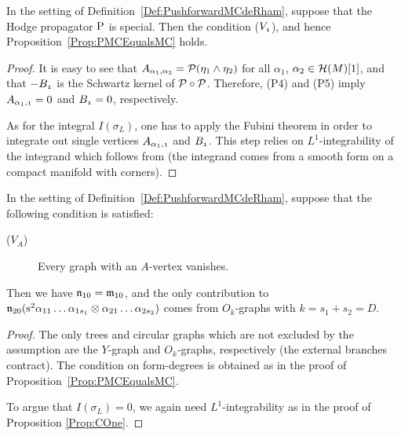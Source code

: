 \documentclass[\MainFolder/Text.tex]{subfiles}
\begin{document}
\begin{Proposition}\label{Prop:COne}
In the setting of Definition~\ref{Def:PushforwardMCdeRham}, suppose that the Hodge propagator $\mathrm{P}$ is special. Then the condition ($V_{\NOne}$), and hence Proposition~\ref{Prop:PMCEqualsMC} holds.
\end{Proposition}
\begin{proof}
It is easy to see that $A_{\alpha_1,\alpha_2} = \mathcal{P}(\eta_1 \wedge \eta_2)$ for all $\alpha_1$, $ \alpha_2\in \mathcal{H}(M)[1]$, and that $-B_{\NOne}$ is the Schwartz kernel of $\mathcal{P} \circ \mathcal{P}$. Therefore, (P4) and (P5) imply $A_{\alpha_1,\NOne}=0$ and $B_{\NOne} = 0$, respectively.

As for the integral $I(\sigma_L)$,  one has to apply the Fubini theorem in order to integrate out single vertices $A_{\alpha_1, \NOne}$ and $B_{\NOne}$. This step relies on $L^1$-integrability of the integrand which follows from \cite{Cieliebak2018} (the integrand comes from a smooth form on a compact manifold with corners).
\end{proof}
\begin{Proposition}\label{Prop:Avertexvanish}
In the setting of Definition~\ref{Def:PushforwardMCdeRham}, suppose that the following condition is satisfied:
\begin{description}
\item[($V_A$)] Every graph with an $A$-vertex vanishes.
\end{description}
Then we have $\mathfrak{n}_{10} = \mathfrak{m}_{10}$, and the only contribution to $\mathfrak{n}_{20}(\mathrm{s}^2 \alpha_{11}\dots \alpha_{1s_1} \otimes \alpha_{21}\dots \alpha_{2s_2})$ comes from $O_k$-graphs with $k = s_1 + s_2 = D$.
\end{Proposition}

\begin{proof}
The only trees and circular graphs which are not excluded by the assumption are the $Y$-graph and $O_k$-graphs, respectively (the external branches contract). The condition on form-degrees is obtained as in the proof of Proposition~\ref{Prop:PMCEqualsMC}.

To argue that $I(\sigma_L)=0$, we again need $L^1$-integrability as in the proof of Proposition \ref{Prop:COne}.
\end{proof}
\end{document}
